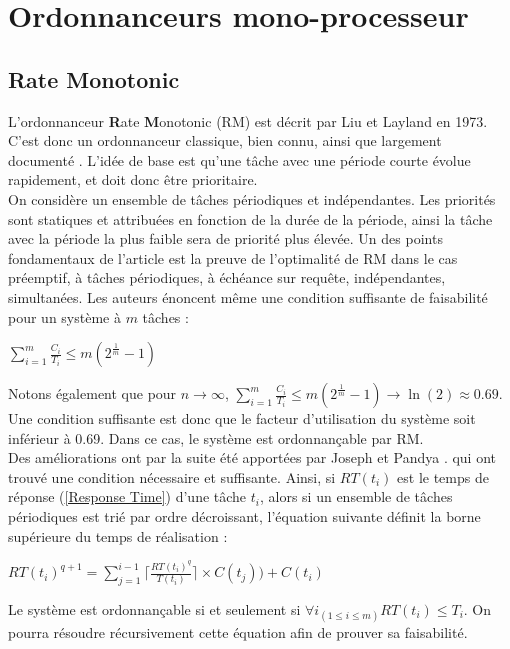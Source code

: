\documentclass[11pt,a4paper,oneside]{report}
\begin{document}
\section{Ordonnanceurs mono-processeur}

\subsection{Rate Monotonic}
L'ordonnanceur \textbf{R}ate \textbf{M}onotonic (RM) est décrit par Liu et Layland \cite{liu_scheduling_1973} en 1973. C'est 
donc un ordonnanceur classique, bien connu, ainsi que largement documenté \cite{kermia_ordonnancement_2009}. 
L'idée de base est qu'une tâche avec une période courte évolue rapidement, et 
doit donc être prioritaire.\\
On considère un ensemble de tâches périodiques et indépendantes.
Les priorités sont statiques et attribuées en fonction de la durée de la période, ainsi 
la tâche avec la période la plus faible sera de priorité plus élevée. 
Un des points fondamentaux de l'article est la preuve de l'optimalité de RM dans le cas 
préemptif, à tâches périodiques, à échéance sur requête, indépendantes, simultanées.
Les auteurs énoncent même une condition suffisante de faisabilité pour un système à $m$ tâches : \\
\begin{center}
	$\sum_{i=1}^{m}\frac{C_i}{T_i} \leq m(2^{\frac{1}{m}}-1)$
\end{center}
Notons également que pour $n \rightarrow \infty$, $\sum_{i=1}^{m}\frac{C_i}{T_i} \leq m(2^{\frac{1}{m}}-1) \rightarrow \ln(2) \approx 0.69$.
Une condition suffisante est donc que le facteur d'utilisation du système soit inférieur à 0.69. 
Dans ce cas, le système est ordonnançable par RM.\\

Des améliorations ont par la suite été apportées par Joseph et Pandya \cite{joseph_finding_1986}.
qui ont trouvé une condition nécessaire et suffisante. 
Ainsi, si $RT(t_i)$ est le temps de réponse (\ref{Response Time}) d'une tâche $t_i$, 
alors si un ensemble de tâches périodiques est trié par ordre décroissant, l'équation suivante 
définit la borne supérieure du temps de réalisation :
\begin{center}
	$RT(t_i)^{q+1} = \sum_{j=1}^{i-1} \lceil \frac{RT(t_i)^q}{T(t_i)} \rceil \times C(t_j)) + C(t_i)$
\end{center}
Le système est ordonnançable si et seulement si $\forall i_{(1 \leq i \leq m)}RT(t_i) \leq T_i$.
On pourra résoudre récursivement cette équation afin de prouver sa faisabilité.\\
\end{document}
